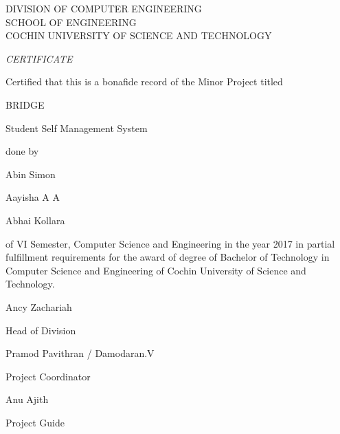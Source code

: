 \documentclass{article}
\begin{document}
\begin{center}

\LARGE
DIVISION OF COMPUTER ENGINEERING\\
SCHOOL OF ENGINEERING\\
COCHIN UNIVERSITY OF SCIENCE AND TECHNOLOGY\\

\hspace{1em}

\huge
\emph{CERTIFICATE}

\hspace{1em}

\large
Certified that this is a bonafide record of the Minor Project titled

\hspace{1em}

\LARGE
BRIDGE

\large
Student Self Management System

\hspace{1em}

done by

\hspace{1em}

\Large
Abin Simon

\Large
Aayisha A A

\Large
Abhai Kollara

\hspace{1em}

\large
of VI Semester, Computer Science and Engineering in the year 2017 in partial fulfillment requirements for the award of degree of Bachelor of Technology in Computer Science and Engineering of Cochin University of Science and Technology.

\hspace{1em}
\vspace{5em}

\begin{minipage}[b]{0.33333\textwidth}
\raggedright
Ancy Zachariah

Head of Division\\
\end{minipage}%
\begin{minipage}[b]{0.33333\textwidth}
\centering
Pramod Pavithran / Damodaran.V

Project Coordinator\\
\end{minipage}%
\begin{minipage}[b]{0.33333\textwidth}
\raggedleft
Anu Ajith

Project Guide\\
\end{minipage}



\end{center}
\end{document}

